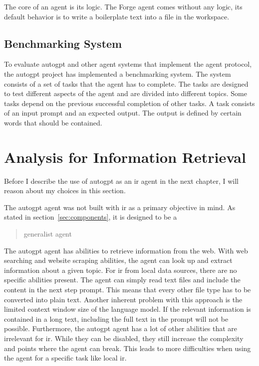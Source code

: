 \documentclass[../main.tex]{subfiles}
\begin{document}
The core of an agent is its logic.
The Forge agent comes without any logic,
its default behavior is to write a boilerplate text into a file in the workspace.

\subsection{Benchmarking System}
\label{subsec:benchmarking}

To evaluate \gls{autogpt} and other agent systems that implement the agent protocol,
the \gls{autogpt} project has implemented a benchmarking system.
The system consists of a set of tasks that the agent has to complete.
The tasks are designed to test different aspects of the agent and are divided into different topics.
Some tasks depend on the previous successful completion of other tasks.
A task consists of an input prompt and an expected output.
The output is defined by certain words that should be contained.

\section{Analysis for Information Retrieval}
\label{sec:analysis}

Before I describe the use of \gls{autogpt} as an \gls{ir} agent in the next chapter,
I will reason about my choices in this section.

The \gls{autogpt} agent was not built with \gls{ir} as a primary objective in mind.
As stated in section~\ref{sec:components}, it is designed to be a \blockquote{generalist agent}.
The \gls{autogpt} agent has abilities to retrieve information from the web.
With web searching and website scraping abilities, the agent can
look up and extract information about a given topic.
For \gls{ir} from local data sources, there are no specific abilities present.
The agent can simply read text files and include the content in the next step prompt.
This means that every other file type has to be converted into plain text.
Another inherent problem with this approach is the limited context window size of the language model.
If the relevant information is contained in a long text, including the full text
in the prompt will not be possible.
Furthermore, the \gls{autogpt} agent has a lot of other abilities that are irrelevant
for \gls{ir}.
While they can be disabled, they still increase the complexity and points where the agent
can break.
This leads to more difficulties when using the agent for a specific task
like local \gls{ir}.
\end{document}

